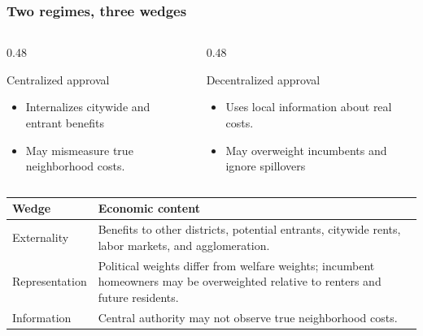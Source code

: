 \begin{frame}[t]
    \frametitle{Two regimes, three wedges}
    \small

    \begin{columns}[T,totalwidth=\textwidth]
        \begin{column}{0.48\textwidth}
            \begin{block}{Centralized approval}
                \begin{itemize}
                    \item Internalizes citywide and entrant benefits \cite{khan_decentralized_2021,mast_warding_2024}
                    \item May mismeasure true neighborhood costs.
                \end{itemize}
            \end{block}
        \end{column}
        \begin{column}{0.48\textwidth}
            \begin{block}{Decentralized approval}
                \begin{itemize}
                    \item Uses local information about real costs.
                    \item May overweight incumbents and ignore spillovers \cite{fischel_homevoter_2009}
                \end{itemize}
            \end{block}
        \end{column}
    \end{columns}

    \vspace{0.5em}
    \begin{center}
        \footnotesize
        \begin{tabular}{>{\raggedright\arraybackslash}p{}>{\raggedright\arraybackslash}p{}}
            \toprule
            \textbf{Wedge} & \textbf{Economic content} \\
            \midrule
            Externality & Benefits to other districts, potential entrants, citywide rents, labor markets, and agglomeration. \\
            Representation & Political weights differ from welfare weights; incumbent homeowners may be overweighted relative to renters and future residents. \\
            Information & Central authority may not observe true neighborhood costs. \\
            \bottomrule
        \end{tabular}
    \end{center}

\end{frame}

